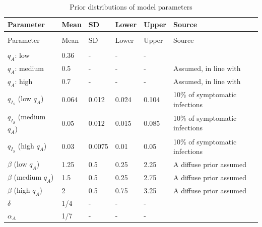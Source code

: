 \documentclass[11pt]{article}
\begin{document}
\begin{spacing}{.9}
	\begin{longtable}[H] {p{} p{} p{} p{} p{} p{} }
		\caption{Prior distributions of model parameters} \\
		Parameter & Mean & SD & Lower & Upper & Source   \\[0.5em] \hline
		{} & {} & {} & {} & {} & {} \\
		\endfirsthead
		Parameter & Mean & SD & Lower & Upper & Source  \\[0.5em] \hline
		{} & {} & {} & {} & {} & {}  \\
		\endhead
		$q_A$: low & 0.36 & {-} & {-} & {-} & \citep{nishiura2020estimation, mizumoto2020estimating, russell2020estimating}  \\[0.5em]
		$q_A$: medium & 0.5 & {-} & {-} & {-} & Assumed, in line with \citep{he2020estimation, emery2020contribution, kimball2020asymptomatic} \\[0.5em]
		$q_A$: high & 0.7  & {-} & {-} & {-} & Assumed, in line with \citep{he2020estimation, emery2020contribution, kimball2020asymptomatic} \\[0.5em]
		$q_{I_S}$ (low $q_A$) & 0.064 & 0.012 & 0.024 & 0.104 & 10\% of symptomatic infections \citep{verity2020estimates, bi2020epidemiology, salje2020estimating} \\[0.5em]
		$q_{I_S}$ (medium $q_A$) & 0.05 & 0.012 & 0.015 & 0.085 & 10\% of symptomatic infections \citep{verity2020estimates, bi2020epidemiology, salje2020estimating} \\[0.5em]
		$q_{I_S}$ (high $q_A$) & 0.03 & 0.0075 & 0.01 & 0.05 & 10\% of symptomatic infections \citep{verity2020estimates, bi2020epidemiology, salje2020estimating} \\[0.5em]
		$\beta$ (low $q_A$) & 1.25 & 0.5 & 0.25 & 2.25 & A diffuse prior assumed \\[0.5em]
		$\beta$ (medium $q_A$) & 1.5 & 0.5 & 0.25 & 2.75 & A diffuse prior assumed \\[0.5em]
		$\beta$ (high $q_A$) & 2 & 0.5 & 0.75 & 3.25 & A diffuse prior assumed \\[0.5em]
		$\delta$ & 1/4 & {-} & {-} & {-} & \citep{lauer2020incubation, bi2020epidemiology, li2020early, linton2020incubation, he2020estimation, salje2020estimating, wei2020presymptomatic} \\[0.5em]
		$\alpha_A$ & 1/7 & {-} & {-} & {-} & \citep{wolfel2020virological} \\[0.5em]

\end{longtable}
\end{spacing}
\end{document}
